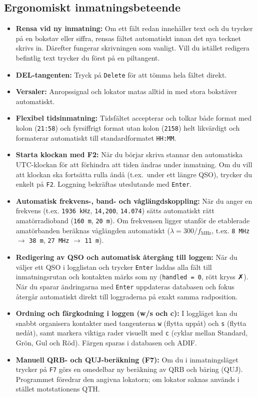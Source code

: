 \documentclass[11pt,a4paper]{article}
\begin{document}
\subsection{Ergonomiskt inmatningsbeteende}
\begin{itemize}
    \item \textbf{Rensa vid ny inmatning:} Om ett fält redan innehåller text och du trycker på en bokstav eller siffra, rensas fältet automatiskt innan det nya tecknet skrivs in. Därefter fungerar skrivningen som vanligt. Vill du istället redigera befintlig text trycker du först på en piltangent.
    \item \textbf{DEL-tangenten:} Tryck på \texttt{Delete} för att tömma hela fältet direkt.
    \item \textbf{Versaler:} Anropssignal och lokator matas alltid in med stora bokstäver automatiskt.
    \item \textbf{Flexibel tidsinmatning:} Tidsfältet accepterar och tolkar både format med kolon (\texttt{21:58}) och fyrsiffrigt format utan kolon (\texttt{2158}) helt likvärdigt och formaterar automatiskt till standardformatet \texttt{HH:MM}.
    \item \textbf{Starta klockan med F2:} När du börjar skriva stannar den automatiska UTC-klockan för att förhindra att tiden ändras under inmatning. Om du vill att klockan ska fortsätta rulla ändå (t.ex.\ under ett längre QSO), trycker du enkelt på \texttt{F2}. Loggning bekräftas uteslutande med \texttt{Enter}.
    \item \textbf{Automatisk frekvens-, band- och våglängdskoppling:} När du anger en frekvens (t.ex. \texttt{1936 kHz}, \texttt{14,200}, \texttt{14.074}) sätts automatiskt rätt amatörradioband (\texttt{160 m}, \texttt{20 m}). Om frekvensen ligger utanför de etablerade amatörbanden beräknas våglängden automatiskt ($\lambda = 300 / f_{\text{MHz}}$, t.ex. \texttt{8 MHz} $\rightarrow$ \texttt{38 m}, \texttt{27 MHz} $\rightarrow$ \texttt{11 m}).
    \item \textbf{Redigering av QSO och automatisk återgång till loggen:} När du väljer ett QSO i logglistan och trycker \texttt{Enter} laddas alla fält till inmatningsrutan och kontakten märks som ny (\texttt{handled = 0}, rött kryss ✗). När du sparar ändringarna med \texttt{Enter} uppdateras databasen och fokus återgår automatiskt direkt till loggraderna på exakt samma radposition.
    \item \textbf{Ordning och färgkodning i loggen (w/s och c):} I loggläget kan du snabbt organisera kontakter med tangenterna \texttt{w} (flytta uppåt) och \texttt{s} (flytta nedåt), samt markera viktiga rader visuellt med \texttt{c} (cyklar mellan Standard, Grön, Gul och Röd). Färgen sparas i databasen och ADIF.
    \item \textbf{Manuell QRB- och QUJ-beräkning (F7):} Om du i inmatningsläget trycker på \texttt{F7} görs en omedelbar ny beräkning av QRB och bäring (QUJ). Programmet föredrar den angivna lokatorn; om lokator saknas används i stället motstationens QTH.
\end{itemize}
\end{document}
